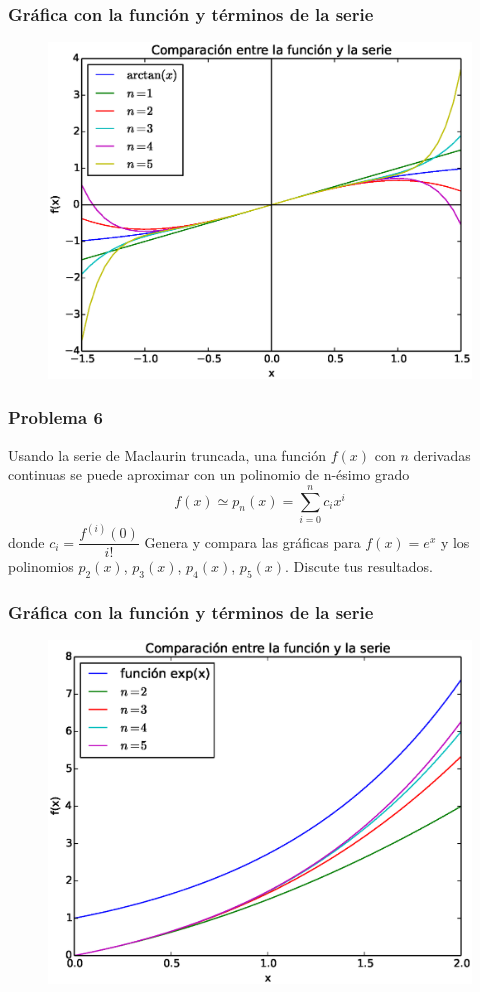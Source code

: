\begin{frame}
\frametitle{Gráfica con la función y términos de la serie}
\begin{figure}
	\centering
	\includegraphics[scale=0.5]{Imagenes/Problema_5_2015_1.eps} 
\end{figure}
\end{frame}
\begin{frame}
\frametitle{Problema 6}
Usando la serie de Maclaurin truncada, una función $f(x)$ con $n$ derivadas continuas se puede aproximar con un polinomio de n-ésimo grado
\[ f(x) \simeq p_{n}(x) = \sum_{i=0}^{n} c_{i} x^{i} \]
donde $c_{i} = \dfrac{f^{(i)}(0)}{i!}$
Genera y compara las gráficas para $f(x)= e^{x}$ y los polinomios $p_{2}(x)$, $p_{3}(x)$, $p_{4}(x)$, $p_{5}(x)$. Discute tus resultados.
\end{frame}
\begin{frame}[fragile]
\frametitle{Gráfica con la función y términos de la serie}
\begin{figure}
	\centering
	\includegraphics[scale=0.5]{Imagenes/Problema_6_2015_1.eps} 
\end{figure}
\end{frame}
